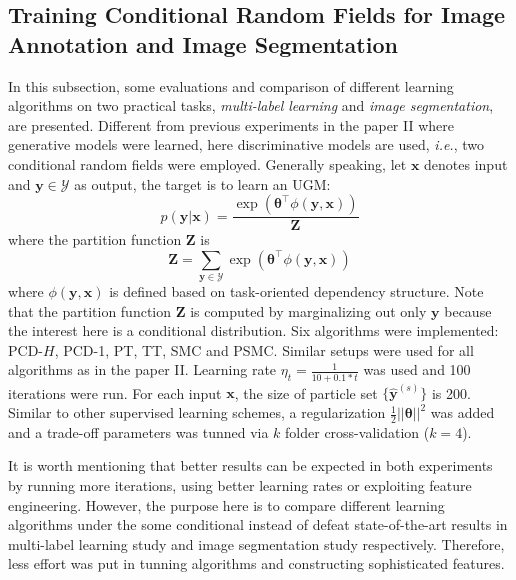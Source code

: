 \subsection {Training Conditional Random Fields for Image Annotation and Image Segmentation}
\label{subsec:graph_experiment}
In this subsection, some evaluations and comparison of different learning algorithms on two practical tasks, \emph{multi-label learning} and \emph{image 
segmentation}, are presented. Different from previous experiments in the paper II where generative models were learned, here discriminative models are used, \emph{i.e.}, two 
conditional random fields were employed. Generally speaking, let $\mathbf{x}$ denotes input and $\mathbf{y}\in \mathcal{Y}$ as output, the target is to 
learn an UGM:  
\begin{equation}
	p(\mathbf{y}|\mathbf{x})=\frac{\exp(\boldsymbol{\theta}^\top \phi(\mathbf{y},\mathbf{x}))}{\mathbf{Z}}
\end{equation}
where the partition function $\mathbf{Z}$ is
\begin{equation}
	\mathbf{Z}=\sum_{\mathbf{y}\in\mathcal{Y}}\exp(\boldsymbol{\theta}^\top \phi(\mathbf{y},\mathbf{x}))
\end{equation}
where $\phi(\mathbf{y},\mathbf{x})$ is defined based on task-oriented dependency structure. Note that the partition function $\mathbf{Z}$ is computed by 
marginalizing out only $\mathbf{y}$ because the interest here is a conditional distribution. Six algorithms 
were implemented: PCD-$H$, PCD-1, PT, TT, SMC and PSMC. Similar setups were used for all algorithms as in the paper II.  
Learning rate $\eta_t=\frac{1}{10+0.1*t}$ was used and 100 iterations were run. For each input $\mathbf{x}$, 
the size of particle set $\{ \hat{\mathbf{y}}^{(s)}\}$ is 200.  Similar to other supervised learning schemes, a regularization $\frac{1}{2}||\boldsymbol{\theta}||^2$ 
was added and a trade-off parameters was tunned via $k$ folder cross-validation ($k=4$).  

It is worth mentioning that better results can be expected in both experiments by running more iterations, using better learning rates or exploiting 
feature engineering. However, the purpose here is to compare different learning algorithms under the some conditional instead of defeat state-of-the-art 
results in multi-label learning study and image segmentation study respectively. Therefore, less effort was put in tunning algorithms and constructing 
sophisticated features. 

